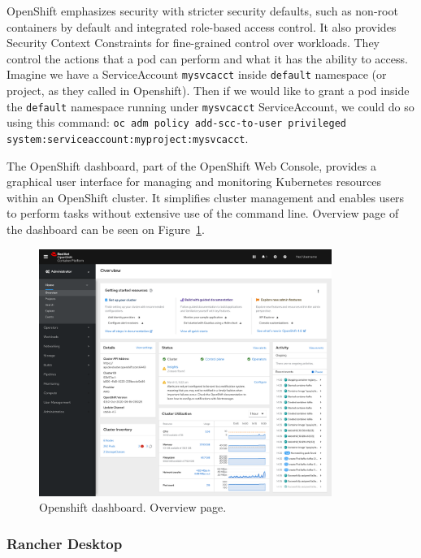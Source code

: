 OpenShift emphasizes security with stricter security defaults, such as non-root containers by default and integrated role-based access control. It also provides Security Context Constraints for fine-grained control over workloads. They control the actions that a pod can perform and what it has the ability to access. Imagine we have a ServiceAccount \lstinline{mysvcacct} inside \lstinline{default} namespace (or project, as they called in Openshift). Then if we would like to grant a pod inside the \lstinline{default} namespace running under \lstinline{mysvcacct} ServiceAccount, we could do so using this command: \lstinline{oc adm policy add-scc-to-user privileged system:serviceaccount:myproject:mysvcacct}.

The OpenShift dashboard, part of the OpenShift Web Console, provides a graphical user interface for managing and monitoring Kubernetes resources within an OpenShift cluster. It simplifies cluster management and enables users to perform tasks without extensive use of the command line. Overview page of the dashboard can be seen on Figure~\ref{img:openshift-dashboard}.

\begin{figure}[!hbt]
	\begin{center}
		\includegraphics[width=0.85\textwidth]{images/openshift-dashboard.png}
        \caption{Openshift dashboard. Overview page.}
		\label{img:openshift-dashboard}
	\end{center}
\end{figure}

\subsubsection*{Rancher Desktop}

